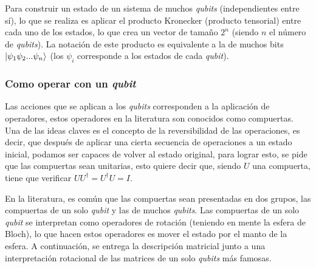 Para construir un estado de un sistema de muchos \textit{qubits} (independientes entre sí), lo que se realiza es aplicar el producto Kronecker (producto tensorial) entre cada uno de los estados, lo que crea un vector de tamaño $2^n$ (siendo $n$ el número de \textit{qubits}). La notación de este producto es equivalente a la de muchos bits $\ket{\psi_1\psi_2 ... \psi_n}$ (los $\psi_i$ corresponde a los estados de cada \textit{qubit}).

\subsubsection{Como operar con un \textit{qubit}}
Las acciones que se aplican a los \textit{qubits} corresponden a la aplicación de operadores, estos operadores en la literatura son conocidos como compuertas. Una de las ideas claves es el concepto de la reversibilidad de las operaciones, es decir, que después de aplicar una cierta secuencia de operaciones a un estado inicial, podamos ser capaces de volver al estado original, para lograr esto, se pide que las compuertas sean unitarias, esto quiere decir que, siendo $U$ una compuerta, tiene que verificar $UU^{\dag}=U^{\dag}U=I$.

En la literatura, es común que las compuertas sean presentadas en dos grupos, las compuertas de un solo \textit{qubit} y las de muchos \textit{qubits}. Las compuertas de un solo \textit{qubit} se interpretan como operadores de rotación (teniendo en mente la esfera de Bloch), lo que hacen estos operadores es mover el estado por el manto de la esfera. A continuación, se entrega la descripción matricial junto a una interpretación rotacional de las matrices de un solo \textit{qubits} más famosas.

